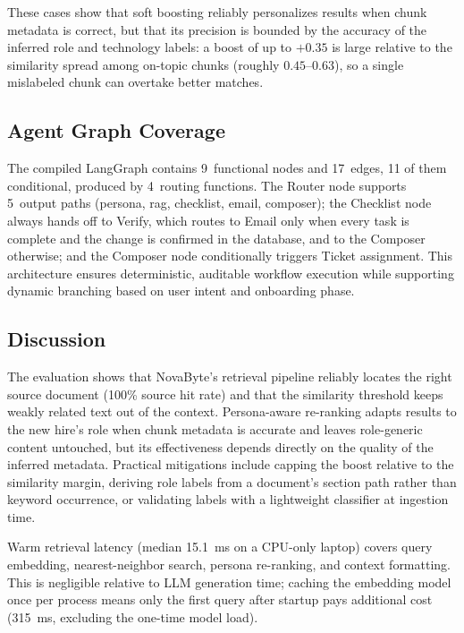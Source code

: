 \documentclass[conference]{IEEEtran}
\begin{document}
These cases show that soft boosting reliably personalizes results when chunk metadata is correct, but that its precision is bounded by the accuracy of the inferred role and technology labels: a boost of up to $+0.35$ is large relative to the similarity spread among on-topic chunks (roughly $0.45$--$0.63$), so a single mislabeled chunk can overtake better matches.

\subsection{Agent Graph Coverage}

The compiled LangGraph contains 9~functional nodes and 17~edges, 11 of them conditional, produced by 4~routing functions. The Router node supports 5~output paths (persona, rag, checklist, email, composer); the Checklist node always hands off to Verify, which routes to Email only when every task is complete and the change is confirmed in the database, and to the Composer otherwise; and the Composer node conditionally triggers Ticket assignment. This architecture ensures deterministic, auditable workflow execution while supporting dynamic branching based on user intent and onboarding phase.

\subsection{Discussion}

The evaluation shows that NovaByte's retrieval pipeline reliably locates the right source document (100\% source hit rate) and that the similarity threshold keeps weakly related text out of the context. Persona-aware re-ranking adapts results to the new hire's role when chunk metadata is accurate and leaves role-generic content untouched, but its effectiveness depends directly on the quality of the inferred metadata. Practical mitigations include capping the boost relative to the similarity margin, deriving role labels from a document's section path rather than keyword occurrence, or validating labels with a lightweight classifier at ingestion time.

Warm retrieval latency (median 15.1~ms on a CPU-only laptop) covers query embedding, nearest-neighbor search, persona re-ranking, and context formatting. This is negligible relative to LLM generation time; caching the embedding model once per process means only the first query after startup pays additional cost (315~ms, excluding the one-time model load).
\end{document}
